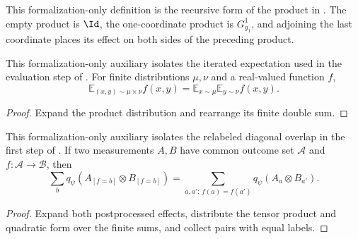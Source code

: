 \begin{definition}
	\label{def:sandwich-ordered-coordinate-product}
	\leanok
	This formalization-only definition is the recursive form of the product in
	\cite[Fact~4.34]{Natarajan2018NEEXP}. The empty product is $\Id$, the one-coordinate
	product is $G^1_{g_1}$, and adjoining the last coordinate places its effect
	on both sides of the preceding product.
\end{definition}

\begin{lemma}
	\label{lem:sandwich-product-average}
	\leanok
	This formalization-only auxiliary isolates the iterated expectation used in
	the evaluation step of \cite[Fact~4.34]{Natarajan2018NEEXP}. For finite distributions
	$\mu,\nu$ and a real-valued function $f$,
	\[
		\mathbb E_{(x,y)\sim\mu\times\nu}f(x,y)
		=\mathbb E_{x\sim\mu}\mathbb E_{y\sim\nu}f(x,y).
	\]
\end{lemma}
\begin{proof}
	\leanok
	Expand the product distribution and rearrange its finite double sum.
\end{proof}

\begin{lemma}
	\label{lem:sandwich-diagonal-postprocess}
	\leanok
	This formalization-only auxiliary isolates the relabeled diagonal overlap in
	the first step of \cite[Fact~4.34]{Natarajan2018NEEXP}. If two measurements $A,B$ have
	common outcome set $\mathcal A$ and $f\colon\mathcal A\to\mathcal B$, then
	\[
		\sum_b q_\psi(A_{[f=b]}\otimes B_{[f=b]})
		=\sum_{a,a':\,f(a)=f(a')}q_\psi(A_a\otimes B_{a'}).
	\]
\end{lemma}
\begin{proof}
	\leanok
	Expand both postprocessed effects, distribute the tensor product and
	quadratic form over the finite sums, and collect pairs with equal labels.
\end{proof}

